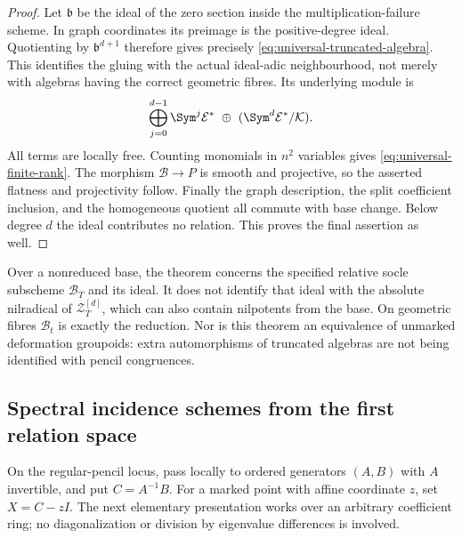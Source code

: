 \begin{proof}
Let \(\mathfrak b\) be the ideal of the zero section inside the
multiplication-failure scheme.  In graph coordinates its preimage
is the positive-degree ideal.  Quotienting by
\(\mathfrak b^{d+1}\) therefore gives precisely
\eqref{eq:universal-truncated-algebra}.  This identifies the gluing
with the actual ideal-adic neighbourhood, not merely with algebras
having the correct geometric fibres.  Its underlying module is
\[
 \bigoplus_{j=0}^{d-1}\Sym^j\mathcal E^*
       \ \oplus\ (\Sym^d\mathcal E^*/\mathcal K).
\]
All terms are locally free.  Counting monomials in \(n^2\)
variables gives \eqref{eq:universal-finite-rank}.  The morphism
\(\mathcal B\to P\) is smooth and projective, so the asserted
flatness and projectivity follow.  Finally the graph description,
the split coefficient inclusion, and the homogeneous quotient all
commute with base change.  Below degree \(d\) the ideal contributes
no relation.  This proves the final assertion as well.
\end{proof}

\begin{remark}\label{rem:relative-reduction-scope}
Over a nonreduced base, the theorem concerns the specified relative
socle subscheme \(\mathcal B_T\) and its ideal.  It does not identify
that ideal with the absolute nilradical of \(\mathcal Z_T^{[d]}\),
which can also contain nilpotents from the base.  On geometric fibres
\(\mathcal B_t\) is exactly the reduction.  Nor is this theorem an
equivalence of unmarked deformation groupoids: extra automorphisms
of truncated algebras are not being identified with pencil
congruences.
\end{remark}

\subsection{Spectral incidence schemes from the first relation space}

On the regular-pencil locus, pass locally to ordered generators
\((A,B)\) with \(A\) invertible, and put \(C=A^{-1}B\).
For a marked point with affine coordinate \(z\), set \(X=C-zI\).
The next elementary presentation works over an arbitrary coefficient
ring; no diagonalization or division by eigenvalue differences is
involved.


